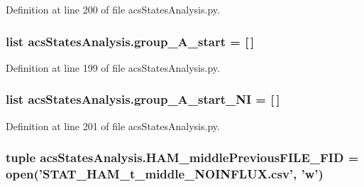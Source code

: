Definition at line 200 of file acs\-States\-Analysis.\-py.

\hypertarget{a00130_a3898175300d001a17a60c23656d2812f}{
\subsubsection[{group\-\_\-\-A\-\_\-start}]{\setlength{\rightskip}{0pt plus 5cm}list acs\-States\-Analysis.\-group\-\_\-\-A\-\_\-start = \mbox{[}$\,$\mbox{]}}}\label{a00130_a3898175300d001a17a60c23656d2812f}


Definition at line 199 of file acs\-States\-Analysis.\-py.

\hypertarget{a00130_aedb746884c5ae6e301c8ad2d8307fe4d}{
\subsubsection[{group\-\_\-\-A\-\_\-start\-\_\-\-N\-I}]{\setlength{\rightskip}{0pt plus 5cm}list acs\-States\-Analysis.\-group\-\_\-\-A\-\_\-start\-\_\-\-N\-I = \mbox{[}$\,$\mbox{]}}}\label{a00130_aedb746884c5ae6e301c8ad2d8307fe4d}


Definition at line 201 of file acs\-States\-Analysis.\-py.

\hypertarget{a00130_aaf0dd6e74d88a7cf2e909301b422c17d}{
\subsubsection[{H\-A\-M\-\_\-middle\-Previous\-F\-I\-L\-E\-\_\-\-F\-I\-D}]{\setlength{\rightskip}{0pt plus 5cm}tuple acs\-States\-Analysis.\-H\-A\-M\-\_\-middle\-Previous\-F\-I\-L\-E\-\_\-\-F\-I\-D = open('S\-T\-A\-T\-\_\-\-H\-A\-M\-\_\-t\-\_\-middle\-\_\-\-N\-O\-I\-N\-F\-L\-U\-X.\-csv', 'w')}}\label{a00130_aaf0dd6e74d88a7cf2e909301b422c17d}


